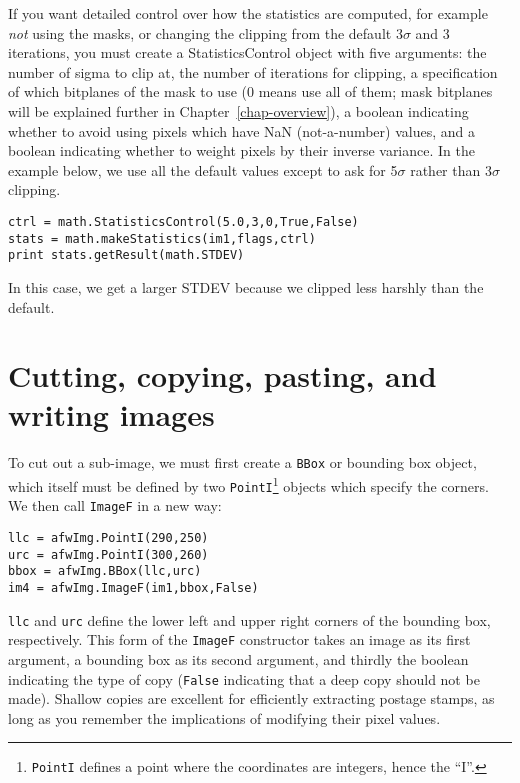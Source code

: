 \documentclass{book}
\begin{document}
If you want detailed control over how the statistics are computed, for
example {\it not} using the masks, or changing the clipping from the
default 3$\sigma$ and 3 iterations, you must create a
StatisticsControl object with five arguments: the number of sigma to
clip at, the number of iterations for clipping, a specification of
which bitplanes of the mask to use (0 means use all of them; mask
bitplanes will be explained further in Chapter~\ref{chap-overview}), a
boolean indicating whether to avoid using pixels which have NaN
(not-a-number) values, and a boolean indicating whether to weight
pixels by their inverse variance.  In the example below, we use all
the default values except to ask for 5$\sigma$ rather than 3$\sigma$
clipping.

\begin{verbatim}
ctrl = math.StatisticsControl(5.0,3,0,True,False)
stats = math.makeStatistics(im1,flags,ctrl)
print stats.getResult(math.STDEV) 
\end{verbatim}

In this case, we get a larger STDEV because we clipped less harshly
than the default.


\section{Cutting, copying, pasting, and writing images}

To cut out a sub-image, we must first create a \texttt{BBox} or
bounding box object, which itself must be defined by two
\texttt{PointI}\footnote{\texttt{PointI} defines a point where the
 coordinates are integers, hence the ``I''.}  objects which specify
the corners.  We then call \texttt{ImageF} in a new way:

\begin{verbatim}
llc = afwImg.PointI(290,250)
urc = afwImg.PointI(300,260)
bbox = afwImg.BBox(llc,urc)
im4 = afwImg.ImageF(im1,bbox,False)
\end{verbatim}

\texttt{llc} and \texttt{urc} define the lower left and upper right
corners of the bounding box, respectively.  This form of the
\texttt{ImageF} constructor takes an image as its first argument, a
bounding box as its second argument, and thirdly the boolean
indicating the type of copy (\texttt{False} indicating that a deep
copy should not be made).  Shallow copies are excellent for
efficiently extracting postage stamps, as long as you remember the
implications of modifying their pixel values.
\end{document}
